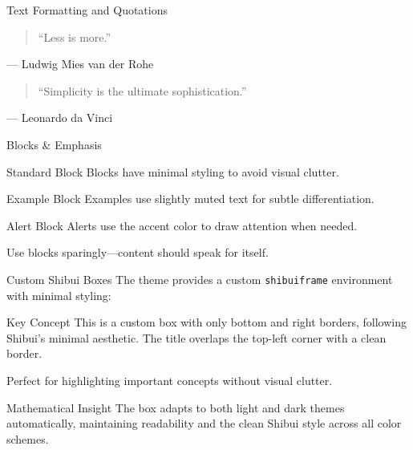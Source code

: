 \documentclass[aspectratio=169]{beamer}
\begin{document}
\begin{frame}{Text Formatting and Quotations}
  \begin{quote}
    ``Less is more.''
  \end{quote}

  \vspace{0.5em}
  \hfill --- Ludwig Mies van der Rohe

  \vspace{2em}

  \begin{quote}
    ``Simplicity is the ultimate sophistication.''
  \end{quote}

  \vspace{0.5em}
  \hfill --- Leonardo da Vinci
\end{frame}

\begin{frame}{Blocks \& Emphasis}
  \begin{block}{Standard Block}
    Blocks have minimal styling to avoid visual clutter.
  \end{block}

  \begin{exampleblock}{Example Block}
    Examples use slightly muted text for subtle differentiation.
  \end{exampleblock}

  \begin{alertblock}{Alert Block}
    Alerts use the accent color to draw attention when needed.
  \end{alertblock}

  \vspace{0.5em}

  Use blocks sparingly---content should speak for itself.
\end{frame}

\begin{frame}{Custom Shibui Boxes}
  The theme provides a custom \texttt{shibuiframe} environment with minimal styling:

  \vspace{0.5em}

  \begin{shibuiframe}{Key Concept}
    This is a custom box with only bottom and right borders, following Shibui's minimal aesthetic. The title overlaps the top-left corner with a clean border.

    \vspace{0.3em}

    Perfect for highlighting important concepts without visual clutter.
  \end{shibuiframe}

  \vspace{0.5em}

  \begin{shibuiframe}{Mathematical Insight}
    The box adapts to both light and dark themes automatically, maintaining readability and the clean Shibui style across all color schemes.
  \end{shibuiframe}
\end{frame}
\end{document}
